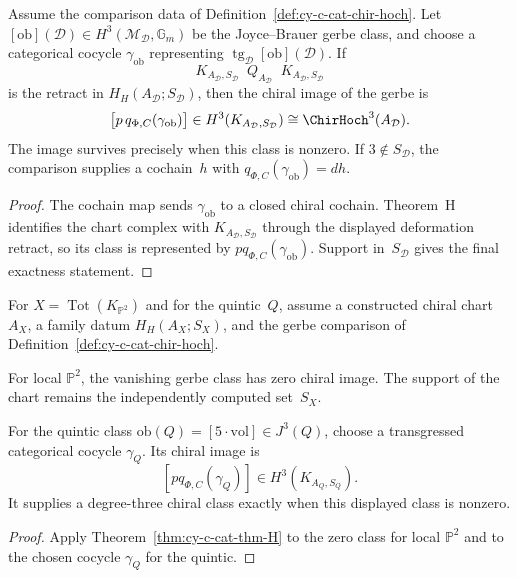 \begin{theorem}
\label{thm:cy-c-cat-thm-H}
Assume the comparison data of
Definition~\ref{def:cy-c-cat-chir-hoch}.  Let
$[\mathrm{ob}](\mathcal D)\in H^3(\mathcal M_\mathcal D,\mathbb G_m)$
be the Joyce--Brauer gerbe class, and choose a categorical cocycle
$\gamma_{\mathrm{ob}}$ representing
$\operatorname{tg}_\mathcal D[\mathrm{ob}](\mathcal D)$.  If
\[
 K_{A_\mathcal D,S_\mathcal D}
 \mathop{\xrightarrow{\ \iota\ }}Q_{A_\mathcal D}
 \mathop{\xrightarrow{\ p\ }}K_{A_\mathcal D,S_\mathcal D}
\]
is the retract in $H_H(A_\mathcal D;S_\mathcal D)$, then the chiral
image of the gerbe is
\[
 \bigl[p\,q_{\Phi,C}(\gamma_{\mathrm{ob}})\bigr]
 \in H^3(K_{A_\mathcal D,S_\mathcal D})
 \cong \ChirHoch^3(A_\mathcal D).
\]
The image survives precisely when this class is nonzero.  If
$3\notin S_\mathcal D$, the comparison supplies a cochain~$h$ with
$q_{\Phi,C}(\gamma_{\mathrm{ob}})=dh$.
\end{theorem}

\begin{proof}
The cochain map sends $\gamma_{\mathrm{ob}}$ to a closed chiral
cochain.  Theorem~H identifies the chart complex with
$K_{A_\mathcal D,S_\mathcal D}$ through the displayed deformation
retract, so its class is represented by
$p q_{\Phi,C}(\gamma_{\mathrm{ob}})$.  Support in~$S_\mathcal D$
gives the final exactness statement.
\end{proof}

\begin{corollary}
\label{cor:cy-c-cat-thm-H-examples}
For $X=\operatorname{Tot}(K_{\mathbb P^2})$ and for the quintic~$Q$,
assume a constructed chiral chart $A_X$, a family datum
$H_H(A_X;S_X)$, and the gerbe comparison of
Definition~\ref{def:cy-c-cat-chir-hoch}.

For local $\mathbb P^2$, the vanishing gerbe class has zero chiral
image.  The support of the chart remains the independently computed
set~$S_X$.

For the quintic class
$\mathrm{ob}(Q)=[5\cdot\mathrm{vol}]\in J^3(Q)$, choose a
transgressed categorical cocycle $\gamma_Q$.  Its chiral image is
\[
 [p q_{\Phi,C}(\gamma_Q)]
 \in H^3(K_{A_Q,S_Q}).
\]
It supplies a degree-three chiral class exactly when this displayed
class is nonzero.
\end{corollary}

\begin{proof}
Apply Theorem~\ref{thm:cy-c-cat-thm-H} to the zero class for local
$\mathbb P^2$ and to the chosen cocycle $\gamma_Q$ for the quintic.
\end{proof}

